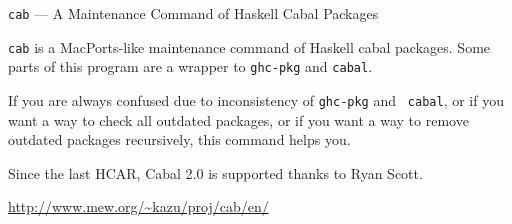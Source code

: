 \begin{hcarentry}{{\tt cab} --- A Maintenance Command of Haskell Cabal Packages}
\makeheader

{\tt cab} is a MacPorts-like maintenance command of Haskell cabal packages.
Some parts of this program are a wrapper to {\tt ghc-pkg} and {\tt cabal}.

If you are always confused due to inconsistency of {\tt ghc-pkg} and {\tt
cabal}, or if you want a way to check all outdated packages, or if you want a
way to remove outdated packages recursively, this command helps you.

Since the last HCAR, Cabal 2.0 is supported thanks to Ryan Scott.

\FurtherReading
  \url{http://www.mew.org/~kazu/proj/cab/en/}
\end{hcarentry}
